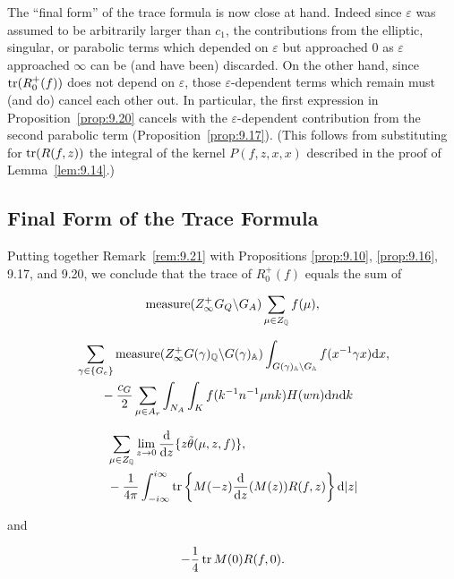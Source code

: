 \begin{remark}\label{rem:9.21}

The ``final form'' of the trace formula is now close at hand. Indeed since $\varepsilon$ was assumed to be arbitrarily larger than $c_1$, the contributions from the elliptic, singular, or parabolic terms which depended on $\varepsilon$ but approached 0 as $\varepsilon$ approached $\infty$ can be (and have been) discarded. On the other hand, since $\operatorname{tr}(R_0^{+}(f))$ does not depend on $\varepsilon$, those $\varepsilon$-dependent terms which remain must (and do) cancel each other out. In particular, the first expression in Proposition~\ref{prop:9.20} cancels with the $\varepsilon$-dependent contribution from the second parabolic term (Proposition~\ref{prop:9.17}). (This follows from substituting for $\operatorname{tr}(R(f, z))$ the integral of the kernel $P(f, z, x, x)$ described in the proof of Lemma~\ref{lem:9.14}.)

\end{remark}

\subsection{Final Form of the Trace Formula}

Putting together Remark~\ref{rem:9.21} with Propositions \ref{prop:9.10}, \ref{prop:9.16}, 9.17, and 9.20, we conclude that the trace of $R_0^{+}(f)$ equals the sum of

\[
\operatorname{measure}(Z_\infty^{+}G_Q \backslash G_A)\sum_{\mu \in Z_{\mathbb{Q}}} f(\mu),
\]

\[
\begin{aligned}
&\sum_{\gamma \in \{G_e\}}\operatorname{measure}(Z_\infty^{+}G(\gamma)_{\mathbb{Q}} \backslash G(\gamma)_{\mathbb{A}})\int_{G(\gamma)_{\mathbb{A}} \backslash G_{\mathbb{A}}} f(x^{-1}\gamma x)\mathrm{d} x,\\
&\qquad - \frac{c_G}{2}\sum_{\mu \in A_r}\int_{N_A}\int_K f(k^{-1}n^{-1}\mu nk)H(wn)\mathrm{d} n\mathrm{d} k
\end{aligned}
\]

\[
\begin{aligned}
&\sum_{\mu \in Z_{\mathbb{Q}}}\lim_{z \to 0}\frac{\mathrm{d}}{\mathrm{d} z}\{z\tilde{\theta}(\mu, z, f)\},\\
&- \frac{1}{4\pi}\int_{-i\infty}^{i\infty}\operatorname{tr}\left\{M(-z)\frac{\mathrm{d}}{\mathrm{d} z}(M(z))R(f, z)\right\}\mathrm{d}|z|
\end{aligned}
\]

and

\[
-\frac{1}{4}\operatorname{tr} M(0)R(f, 0).
\]


